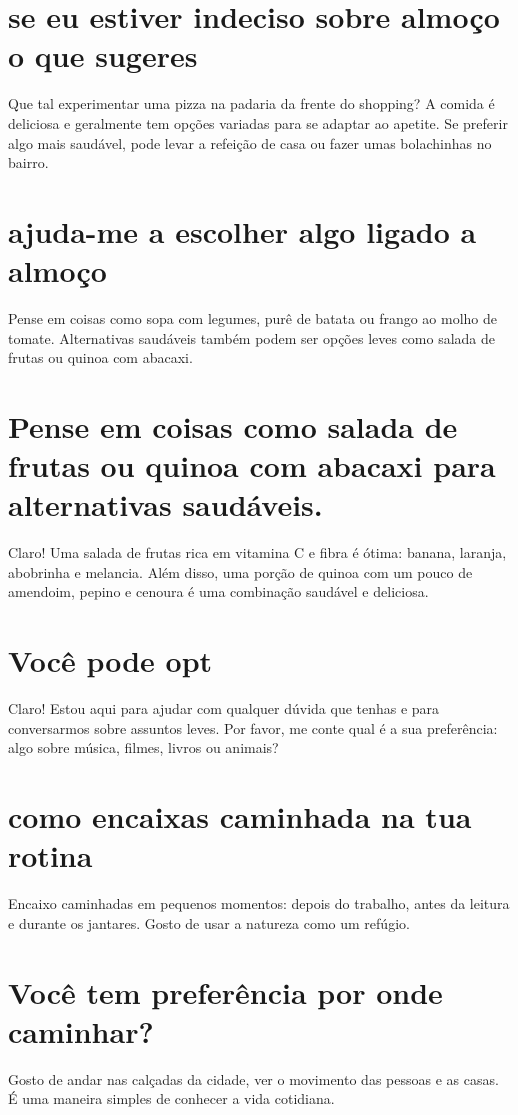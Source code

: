 \documentclass[11pt,a4paper]{article}
\begin{document}
\section{se eu estiver indeciso sobre almoço o que sugeres}
Que tal experimentar uma pizza na padaria da frente do shopping? A comida é deliciosa e geralmente tem opções variadas para se adaptar ao apetite. Se preferir algo mais saudável, pode levar a refeição de casa ou fazer umas bolachinhas no bairro.

\section{ajuda-me a escolher algo ligado a almoço}
Pense em coisas como sopa com legumes, purê de batata ou frango ao molho de tomate. Alternativas saudáveis também podem ser opções leves como salada de frutas ou quinoa com abacaxi.

\section{Pense em coisas como salada de frutas ou quinoa com abacaxi para alternativas saudáveis.}
Claro! Uma salada de frutas rica em vitamina C e fibra é ótima: banana, laranja, abobrinha e melancia. Além disso, uma porção de quinoa com um pouco de amendoim, pepino e cenoura é uma combinação saudável e deliciosa.

\section{Você pode opt}
Claro! Estou aqui para ajudar com qualquer dúvida que tenhas e para conversarmos sobre assuntos leves. Por favor, me conte qual é a sua preferência: algo sobre música, filmes, livros ou animais?

\section{como encaixas caminhada na tua rotina}
Encaixo caminhadas em pequenos momentos: depois do trabalho, antes da leitura e durante os jantares. Gosto de usar a natureza como um refúgio.

\section{Você tem preferência por onde caminhar?}
Gosto de andar nas calçadas da cidade, ver o movimento das pessoas e as casas. É uma maneira simples de conhecer a vida cotidiana.
\end{document}
